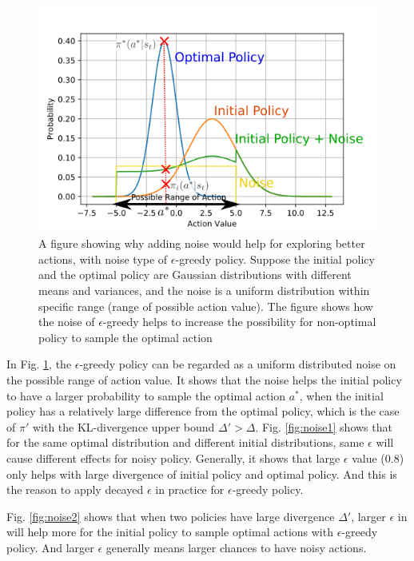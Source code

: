 \documentclass{article}
\begin{document}
\begin{figure}[htbp]
	\centering
	\includegraphics[scale=0.8]{img/noise2.png}
	\caption{A figure showing why adding noise would help for exploring better actions, with noise type of $\epsilon$-greedy policy. Suppose the initial policy and the optimal policy are Gaussian distributions with different means and variances, and the noise is a uniform distribution within specific range (range of possible action value). The figure shows how the noise of $\epsilon$-greedy helps to increase the possibility for non-optimal policy to sample the optimal action }
	\label{fig:noise}
\end{figure}

In Fig. \ref{fig:noise}, the $\epsilon$-greedy policy can be regarded as a uniform distributed noise on the possible range of action value. It shows that the noise helps the initial policy to have a larger probability to sample the optimal action $a^*$, when the initial policy has a relatively large difference from the optimal policy, which is the case of $\pi'$ with the KL-divergence upper bound  $\Delta'>\Delta$. Fig. \ref{fig:noise1} shows that for the same optimal distribution and different initial distributions, same $\epsilon$ will cause different effects for noisy policy. Generally, it shows that large $\epsilon$ value (0.8) only helps with large divergence of initial policy and optimal policy. And this is the reason to apply decayed $\epsilon$ in practice for $\epsilon$-greedy policy.

Fig. \ref{fig:noise2} shows that when two policies have large divergence $\Delta'$, larger $\epsilon$ in will help more for the initial policy to sample optimal actions with $\epsilon$-greedy policy. And larger $\epsilon$ generally means larger chances to have noisy actions.
\end{document}
